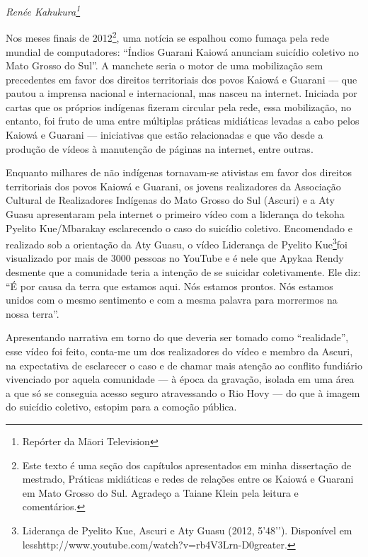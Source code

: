 \begin{flushright}
\emph{Renée Kahukura\footnote{Repórter da M\=aori Television}}
\end{flushright}

Nos meses finais de 2012\footnote{Este texto é uma seção dos capítulos
apresentados em minha dissertação de mestrado, Práticas midiáticas e
redes de relações entre os Kaiowá e Guarani em Mato Grosso do Sul.
Agradeço a Taiane Klein pela leitura e comentários.}, uma notícia se
espalhou como fumaça pela rede mundial de computadores: ``Índios Guarani
Kaiowá anunciam suicídio coletivo no Mato Grosso do Sul''. A manchete
seria o motor de uma mobilização sem precedentes em favor dos direitos
territoriais dos povos Kaiowá e Guarani — que pautou a imprensa
nacional e internacional, mas nasceu na internet. Iniciada por cartas
que os próprios indígenas fizeram circular pela rede, essa mobilização,
no entanto, foi fruto de uma entre múltiplas práticas midiáticas
levadas a cabo pelos Kaiowá e Guarani — iniciativas que estão
relacionadas e que vão desde a produção de vídeos à manutenção de
páginas na internet, entre outras. 

Enquanto milhares de não indígenas tornavam-se ativistas em favor dos
direitos territoriais dos povos Kaiowá e Guarani, os jovens
realizadores da Associação Cultural de Realizadores Indígenas do Mato
Grosso do Sul (Ascuri) e a Aty Guasu apresentaram pela internet o
primeiro vídeo com a liderança do tekoha Pyelito Kue/Mbarakay
esclarecendo o caso do suicídio coletivo. Encomendado e realizado sob a
orientação da Aty Guasu, o vídeo Liderança de Pyelito
Kue\footnote{Liderança de Pyelito Kue, Ascuri e Aty Guasu (2012,
5’48’’). Disponível em
{less}http://www.youtube.com/watch?v=rb4V3Lrn-D0{greater}.}foi
visualizado por mais de 3000 pessoas no YouTube e é nele que Apykaa
Rendy desmente que a comunidade teria a intenção de se suicidar
coletivamente. Ele diz: ``É por causa da terra que estamos aqui. Nós
estamos prontos. Nós estamos unidos com o mesmo sentimento e com a
mesma palavra para morrermos na nossa terra''.

Apresentando narrativa em torno do que deveria ser tomado como
``realidade'', esse vídeo foi feito, conta-me um dos realizadores do
vídeo e membro da Ascuri, na expectativa de esclarecer o caso e de
chamar mais atenção ao conflito fundiário vivenciado por aquela
comunidade — à época da gravação, isolada em uma área a que só se
conseguia acesso seguro atravessando o Rio Hovy — do que à imagem do
suicídio coletivo, estopim para a comoção pública.

